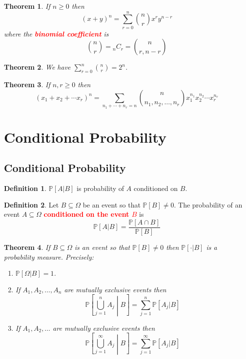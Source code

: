 \documentclass{article}
\newcommand{\PP}{\mathbb{P}}
\newcommand{\bfred}[1]{\textcolor{red}{\textbf{#1}}}
\theoremstyle{plain}
\newtheorem{thm}{Theorem}[section]
\theoremstyle{definition}
\newtheorem{defn}{Definition}[section]
\theoremstyle{remark}
\begin{document}
\begin{thm}
    If $n \geq 0$ then \[(x+y)^n = \sum_{r=0}^n\binom{n}{r}x^ry^{n-r}\] where the \bfred{binomial coefficient} is \[\binom{n}{r} = {}_nC_r = \binom{n}{r, n-r}\]
\end{thm}

\begin{thm}
    We have $\sum_{r=0}^n\binom{n}{r} = 2^n$.
\end{thm}

\begin{thm}
    If $n, r \geq 0$ then \[(x_1 + x_2 + \dotsb x_r)^n = \sum_{n_1 + \dotsb + n_r = n}\binom{n}{n_1, n_2, \dotsc, n_r} x_1^{n_1}x_2^{n_2} \dotsm x_r^{n_r}\]
\end{thm}

\section{Conditional Probability}
\subsection{Conditional Probability}

\begin{defn}
    $\PP[A \vert B]$ is probability of $A$ conditioned on $B$.
\end{defn}

\begin{defn}
    Let $B \subseteq \Omega$ be an event so that $\PP[B] \neq 0$. The probability of an event $A \subseteq \Omega$ \bfred{conditioned on the event $B$} is \[\PP[A \vert B] = \frac{\PP[A \cap B]}{\PP[B]}\]
\end{defn}

\begin{thm}
    If $B \subseteq \Omega$ is an event so that $\PP[B] \neq 0$ then $\PP[\cdot \vert B]$ is a probability measure. Precisely:
    \begin{enumerate}[1.]
        \item $\PP[\Omega\vert B] = 1$.
        \item If $A_1, A_2, \dotsc, A_n$ are mutually exclusive events then \[\PP\left[\bigcup_{j=1}^nA_j\middle\vert B \right] = \sum_{j=1}^n\PP[A_j\vert B]\]
        \item If $A_1, A_2, \dotsc$ are mutually exclusive events then \[\PP\left[\bigcup_{j=1}^\infty A_j\middle\vert B \right] = \sum_{j=1}^\infty\PP[A_j\vert B]\]
    \end{enumerate}
\end{thm}
\end{document}
